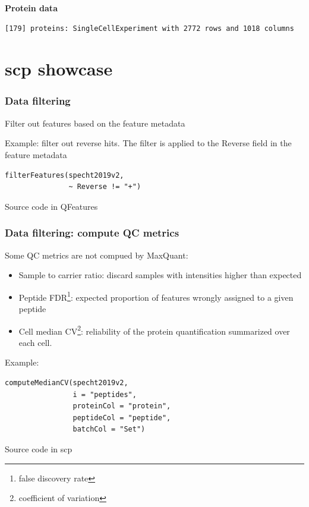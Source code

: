 \documentclass{beamer}
\newcommand{\hcode}[2][lgray]{{\ttfamily\color{vdgray}\colorbox{#1}{#2}}}
\newcommand{\frametitlesection}[1]{\frametitle{\centering #1 \footnotesize \hspace{0pt plus 1 filll} \insertsection}}
\begin{document}
\begin{frame}[fragile]
    \textbf{Protein data}
    
    \begin{lstlisting}[language = TeX, numbers = none, basicstyle = \ttfamily\@setfontsize{\srcsize}{5pt}{5pt}\color{vdgray}]
 [179] proteins: SingleCellExperiment with 2772 rows and 1018 columns
    \end{lstlisting}
    
    
\end{frame}


\section{scp showcase}


\begin{frame}[fragile]
    \frametitlesection{Data filtering}
    
    Filter out features based on the feature metadata
    
    \bigskip
    
    Example: filter out reverse hits. The filter is applied to the 
    \hcode{Reverse} field in the feature metadata

    \begin{lstlisting}
filterFeatures(specht2019v2, 
               ~ Reverse != "+")
    \end{lstlisting}
    
    Source code in \hcode{QFeatures}
\end{frame}

\begin{frame}[fragile]
    \frametitlesection{Data filtering: compute QC metrics}
    \small
    Some QC metrics are not compued by MaxQuant: 
    
    \begin{itemize}
        \item{Sample to carrier ratio}: discard samples with intensities higher 
        than expected
        \item{Peptide FDR\footnote{false discovery rate}: expected proportion of 
        features wrongly assigned to a given peptide}
        \item{Cell median CV\footnote{coefficient of variation}: reliability of 
        the protein quantification summarized over each cell.}
    \end{itemize}
    
    Example:

    \begin{lstlisting}
computeMedianCV(specht2019v2,
                i = "peptides", 
                proteinCol = "protein", 
                peptideCol = "peptide", 
                batchCol = "Set")
    \end{lstlisting}
    
    Source code in \hcode{scp}
    
\end{frame}
\end{document}
